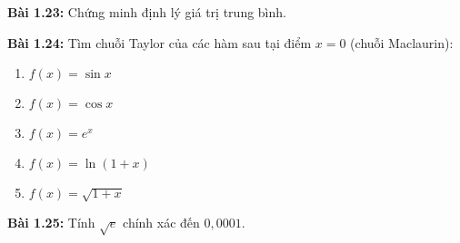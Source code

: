 \textbf{Bài 1.23:} Chứng minh định lý giá trị trung bình.
\vspace{5pt}

\textbf{Bài 1.24:} Tìm chuỗi Taylor của các hàm sau tại điểm \(x=0\) (chuỗi Maclaurin):
\begin{enumerate}[label=(\alph*)]
    \item \(f(x)=\sin x\)
    \item \(f(x)=\cos x\)
    \item \(f(x)=e^x\)
    \item \(f(x)=\ln(1+x)\)
    \item \(f(x)=\sqrt{1+x}\)
\end{enumerate}
\vspace{5pt}

\textbf{Bài 1.25:} Tính \(\sqrt{e}\) chính xác đến \(0,0001\). 